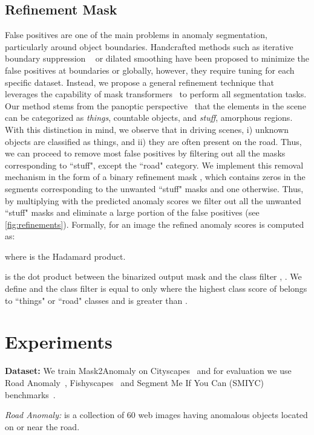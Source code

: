 \documentclass[10pt,twocolumn,letterpaper]{article}
\newcommand{\myparagraph}[1]{\vspace{3pt}\noindent\textbf{#1}}
\begin{document}
\subsection{Refinement Mask}
\label{subsec:RM}
False positives are one of the main problems in anomaly segmentation, particularly around object boundaries. Handcrafted methods such as iterative boundary suppression ~\cite{jung2021standardized} or dilated smoothing have been proposed to minimize the false positives at boundaries or globally, however, they require tuning for each specific dataset. 
Instead, we propose a general refinement technique that leverages the capability of mask transformers~\cite{cheng2022masked} to perform all segmentation tasks.
Our method stems from the panoptic perspective~\cite{kirillov2019panoptic} that the elements in the scene can be categorized as \textit{things}, \ie countable objects, and \textit{stuff}, \ie amorphous regions. 
With this distinction in mind, we observe that in driving scenes, i) unknown objects are classified as things, and ii) they are often present on the road. Thus, we can proceed to remove most false positives by filtering out all the masks corresponding to “stuff", except the ``road" category. We implement this removal mechanism in the form of a binary refinement mask , which contains zeros in the segments corresponding to the unwanted ``stuff" masks and one otherwise. Thus, by multiplying  with the predicted anomaly scores  we filter out all the unwanted ``stuff" masks and eliminate a large portion of the false positives (see \cref{fig:refinements}). Formally, for an image  the refined anomaly scores  is computed as:

where  is the Hadamard product. 

 is the dot product between the binarized output mask  and the class filter , \ie .
We define  and the class filter  is equal to  only where the highest class score of  belongs to ``things" or ``road" classes and is greater than . 

\section{Experiments}
\myparagraph{Dataset:} We train Mask2Anomaly on Cityscapes~\cite{Cordts2016Cityscapes} and for evaluation we use Road Anomaly~\cite{lis2019detecting},
Fishyscapes~\cite{blum2019fishyscapes} and Segment Me If You Can (SMIYC) benchmarks~\cite{chan2021segmentmeifyoucan}. 

\noindent\textit{Road Anomaly:} is a collection of 60 web images having anomalous objects located on or near the road. 
\end{document}
